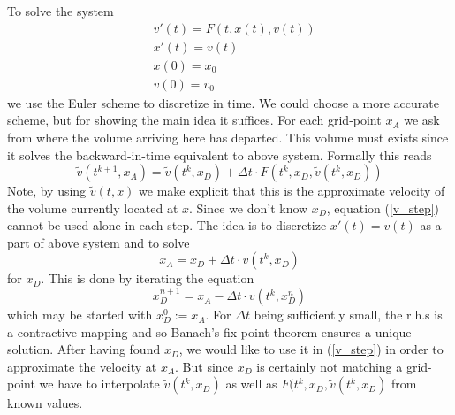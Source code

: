 \documentclass[17pt]{extarticle}
\begin{document}
To solve the system
\begin{align*}
	&v'(t)=F(t,x(t),v(t))\\
	&x'(t)=v(t)\\
	&x(0)=x_0\\
	&v(0)=v_0
\end{align*}
we use the Euler scheme to discretize in time. We could choose a more accurate scheme, but for showing the main idea it suffices. For each grid-point $x_A$ we ask from where the volume arriving here has departed. This volume must exists since it solves the backward-in-time equivalent to above system. Formally this reads
\begin{equation} \label{v_step}
\tilde{v}(t^{k+1}, x_A)=\tilde{v}(t^k, x_D)+\Delta t\cdot F(t^k, x_D, \tilde{v}(t^k, x_D))
\end{equation}
Note, by using $\tilde{v}(t,x)$ we make explicit that this is the approximate velocity of the volume currently located at $x$.
Since we don't know $x_D$, equation (\ref{v_step}) cannot be used alone in each step.
The idea is to discretize $x'(t)=v(t)$ as a part of above system and to solve
\begin{equation}
	x_A=x_D+\Delta t\cdot v(t^k, x_D)
\end{equation} 
for $x_D$.
This is done by iterating the equation
$$
x_D^{n+1}=x_A-\Delta t\cdot v(t^k, x_D^n)
$$
which may be started with $x_D^0:=x_A$.
For $\Delta t$ being sufficiently small, the r.h.s is a contractive mapping and so Banach's fix-point theorem ensures a unique solution.
After having found $x_D$, we would like to use it in (\ref{v_step}) in order to approximate the velocity at $x_A$. But since $x_D$ is certainly not matching a grid-point we have to interpolate $\tilde{v}(t^k, x_D)$ as well as $F(t^k, x_D, \tilde{v}(t^k, x_D)$ from known values.
\end{document}
